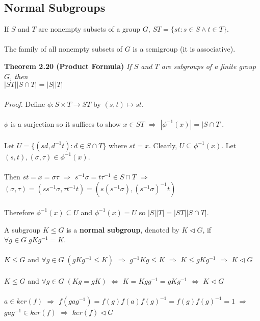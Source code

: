 \documentclass{article}
\begin{document}
\subsection{Normal Subgroups}
If \(S\) and \(T\) are nonempty subsets of a group \(G\), \(ST=\{st:s\in S\land t\in T\}\).\\\\
The family of all nonempty subsets of \(G\) is a semigroup (it is associative).\\
\begin{redrules}\color{red}
\textbf{Theorem 2.20 (Product Formula)} \textit{If \(S\) and \(T\) are subgroups of a finite group \(G\), then\\ \(|ST||S\cap T|=|S||T|\)}\\\\\color{black}
\textit{Proof.} Define \(\phi: S\times T\to ST\) by \((s,t)\mapsto st\). \\\\
\(\phi\) is a surjection so it suffices to show \(x\in ST\) \(\Longrightarrow\) \(|\phi^{-1}(x)|=|S\cap T|\).\\\\
Let \(U=\{(sd,d^{-1}t):d\in S\cap T\}\) where \(st=x\). Clearly, \(U\subseteq \phi^{-1}(x)\). Let \((s,t),(\sigma,\tau)\in\phi^{-1}(x)\).\\\\
Then \(st=x=\sigma\tau\) \(\Longrightarrow\) \(s^{-1}\sigma=t\tau^{-1}\in S\cap T\) \(\Longrightarrow\) \((\sigma,\tau)=(ss^{-1}\sigma,\tau t^{-1}t)=(s(s^{-1}\sigma), (s^{-1}\sigma)^{-1}t)\)\\\\
Therefore \(\phi^{-1}(x)\subseteq U\) and \(\phi^{-1}(x)=U\) so \(|S||T|=|ST||S\cap T|\).
\end{redrules}
A subgroup \(K\le G\) is a \textbf{normal subgroup}, denoted by \(K\vartriangleleft G\), if \(\forall g\in G\;gKg^{-1}=K\).\\\\
\(K\le G\) and \(\forall g\in G\;(gKg^{-1}\le K)\) \(\Longrightarrow\) \(g^{-1}Kg\le K\) \(\Longrightarrow\) \(K\le gKg^{-1}\) \(\Longrightarrow\) \(K\vartriangleleft G\)\\\\
\(K\le G\) and \(\forall g\in G\;(Kg=gK)\) \(\Longleftrightarrow\) \(K=Kgg^{-1}=gKg^{-1}\) \(\Longleftrightarrow\) \(K\vartriangleleft G\)\\\\
\(a\in ker(f)\) \(\Longrightarrow\) \(f(gag^{-1})=f(g)f(a)f(g)^{-1}=f(g)f(g)^{-1}=1\) \(\Longrightarrow\) \(gag^{-1}\in ker(f)\) \(\Longrightarrow\) \(ker(f)\vartriangleleft G\)\\\\
\end{document}
